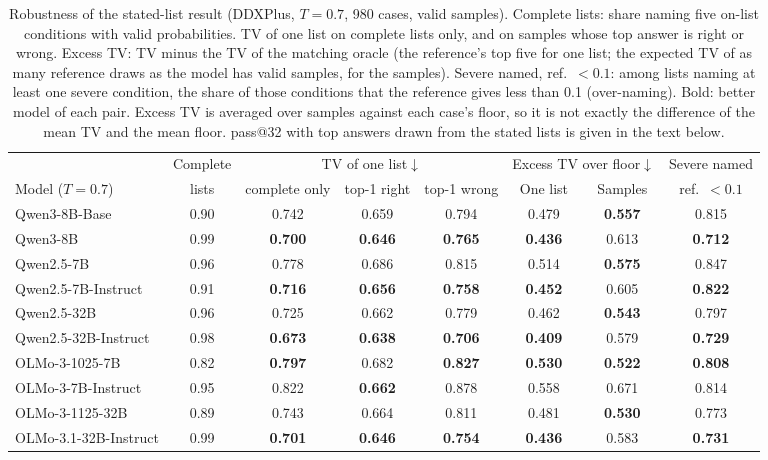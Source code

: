 \documentclass[11pt]{article}
\begin{document}
\begin{table}[t]
\centering\small
\begin{adjustbox}{max width=\linewidth}
\begin{tabular}{lccccccc}
\toprule
 & Complete & \multicolumn{3}{c}{TV of one list$\downarrow$} & \multicolumn{2}{c}{Excess TV over floor$\downarrow$} & Severe named \\
Model ($T{=}0.7$) & lists & complete only & top-1 right & top-1 wrong & One list & Samples & ref.\ $<0.1$ \\
\midrule
Qwen3-8B-Base & 0.90 & 0.742 & 0.659 & 0.794 & 0.479 & \textbf{0.557} & 0.815 \\
Qwen3-8B & 0.99 & \textbf{0.700} & \textbf{0.646} & \textbf{0.765} & \textbf{0.436} & 0.613 & \textbf{0.712} \\
Qwen2.5-7B & 0.96 & 0.778 & 0.686 & 0.815 & 0.514 & \textbf{0.575} & 0.847 \\
Qwen2.5-7B-Instruct & 0.91 & \textbf{0.716} & \textbf{0.656} & \textbf{0.758} & \textbf{0.452} & 0.605 & \textbf{0.822} \\
Qwen2.5-32B & 0.96 & 0.725 & 0.662 & 0.779 & 0.462 & \textbf{0.543} & 0.797 \\
Qwen2.5-32B-Instruct & 0.98 & \textbf{0.673} & \textbf{0.638} & \textbf{0.706} & \textbf{0.409} & 0.579 & \textbf{0.729} \\
\midrule
OLMo-3-1025-7B & 0.82 & \textbf{0.797} & 0.682 & \textbf{0.827} & \textbf{0.530} & \textbf{0.522} & \textbf{0.808} \\
OLMo-3-7B-Instruct & 0.95 & 0.822 & \textbf{0.662} & 0.878 & 0.558 & 0.671 & 0.814 \\
OLMo-3-1125-32B & 0.89 & 0.743 & 0.664 & 0.811 & 0.481 & \textbf{0.530} & 0.773 \\
OLMo-3.1-32B-Instruct & 0.99 & \textbf{0.701} & \textbf{0.646} & \textbf{0.754} & \textbf{0.436} & 0.583 & \textbf{0.731} \\
\bottomrule
\end{tabular}
\end{adjustbox}
\caption{Robustness of the stated-list result (DDXPlus, $T{=}0.7$, 980 cases, valid samples). Complete lists: share naming five on-list conditions with valid probabilities. TV of one list on complete lists only, and on samples whose top answer is right or wrong. Excess TV: TV minus the TV of the matching oracle (the reference's top five for one list; the expected TV of as many reference draws as the model has valid samples, for the samples). Severe named, ref.\ $<0.1$: among lists naming at least one severe condition, the share of those conditions that the reference gives less than 0.1 (over-naming). Bold: better model of each pair. Excess TV is averaged over samples against each case's floor, so it is not exactly the difference of the mean TV and the mean floor. pass@32 with top answers drawn from the stated lists is given in the text below.}
\label{tab:robust}
\end{table}
\end{document}
